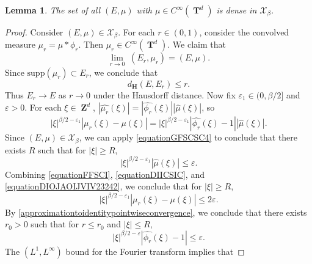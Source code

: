 \documentclass[12pt,reqno]{article}
\numberwithin{equation}{section}
\DeclareMathOperator{\ZZ}{\mathbf{Z}}
\DeclareMathOperator{\TT}{\mathbf{T}}
\newtheorem{lemma}[theorem]{Lemma}
\numberwithin{theorem}{section}
\begin{document}
\begin{lemma} \label{smoothdensitylemma}
    The set of all $(E,\mu)$ with $\mu \in C^\infty(\TT^d)$ is dense in $\mathcal{X}_\beta$.
\end{lemma}
\begin{proof}
    Consider $(E,\mu) \in \mathcal{X}_\beta$. For each $r \in (0,1)$, consider the convolved measure $\mu_r = \mu * \phi_r$. Then $\mu_r \in C^\infty(\TT^d)$. We claim that
    \begin{equation} \label{equationFFSPCOS}
        \lim_{r \to 0}\; (E_r, \mu_r) = (E,\mu).
    \end{equation}
    Since $\text{supp}(\mu_r) \subset E_r$, we conclude that
    \begin{equation} \label{equationFFSICSI}
        d_\mathbf{H}(E,E_r) \leq r.
    \end{equation}
    Thus $E_r \to E$ as $r \to 0$ under the Hausdorff distance. Now fix $\varepsilon_1 \in (0,\beta/2]$ and $\varepsilon > 0$. For each $\xi \in \ZZ^d$, $|\widehat{\mu_r}(\xi)| = |\widehat{\phi_r}(\xi)| |\widehat{\mu}(\xi)|$, so
    \begin{equation} \label{equationFFSCI}
        |\xi|^{\beta/2 - \varepsilon_1} |\mu_r(\xi) - \mu(\xi)| = |\xi|^{\beta/2 - \varepsilon_1} |\widehat{\phi_r}(\xi) - 1| |\widehat{\mu}(\xi)|.
    \end{equation}
    Since $(E,\mu) \in \mathcal{X}_\beta$, we can apply \eqref{equationGFSCSC4} to conclude that there exists $R$ such that for $|\xi| \geq R$,
    \begin{equation} \label{equationDIICSIC}
        |\xi|^{\beta/2 - \varepsilon_1} |\widehat{\mu}(\xi)| \leq \varepsilon.
    \end{equation}
    Combining \eqref{equationFFSCI}, \eqref{equationDIICSIC}, and \eqref{equationDIOJAOIJVIV23242}, we conclude that for $|\xi| \geq R$,
    \begin{equation} \label{equationDSCISIIXX}
        |\xi|^{\beta/2 - \varepsilon_1} |\mu_r(\xi) - \mu(\xi)| \leq 2 \varepsilon.
    \end{equation}
    By \eqref{approximationtoidentitypointwiseconvergence}, we conclude that there exists $r_0 > 0$ such that for $r \leq r_0$ and $|\xi| \leq R$,
    \begin{equation} \label{equationDISCIIS}
        |\xi|^{\beta/2 - \varepsilon} |\widehat{\phi_r}(\xi) - 1| \leq \varepsilon.
    \end{equation}
    The $(L^1,L^\infty)$ bound for the Fourier transform implies that

\end{proof}
\end{document}

